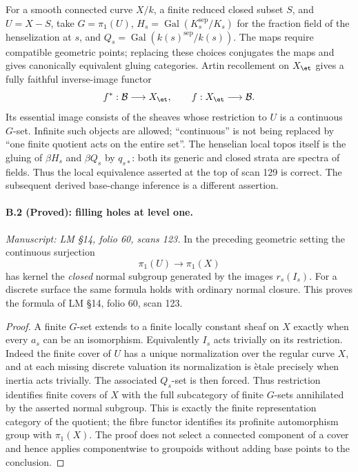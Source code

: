 For a smooth connected curve $X/k$, a finite reduced closed subset
$S$, and $U=X-S$, take $G=\pi_1(U)$,
$H_s=\operatorname{Gal}(K_s^{\mathrm{sep}}/K_s)$ for the fraction field
of the henselization at $s$, and $Q_s=\operatorname{Gal}(k(s)^{\mathrm{sep}}/k(s))$.
The maps require compatible geometric points; replacing these choices
conjugates the maps and gives canonically equivalent gluing categories.
Artin recollement on $X_{\et}$ gives a fully faithful inverse-image
functor
\[
 f^*:\mathcal B\longrightarrow X_{\et},\qquad
 f:X_{\et}\longrightarrow\mathcal B.
\]
Its essential image consists of the sheaves whose restriction to $U$
is a continuous $G$-set. Infinite such objects are allowed; ``continuous''
is not being replaced by ``one finite quotient acts on the entire set''.
The henselian local topos itself is the gluing of $\beta H_s$ and
$\beta Q_s$ by $q_{s*}$: both its generic and closed strata are spectra
of fields. Thus the local equivalence asserted at the top of scan 129
is correct. The subsequent derived base-change inference is a different
assertion.

\paragraph{B.2 (Proved): filling holes at level one.}\label{B2}
\textit{Manuscript: LM \S14, folio 60, scans 123.}
In the preceding geometric setting the continuous surjection
\[
 \pi_1(U)\longrightarrow\pi_1(X)
\]
has kernel the \emph{closed} normal subgroup generated by the images
$r_s(I_s)$. For a discrete surface the same formula holds with ordinary
normal closure. This proves the formula of LM \S14, folio 60, scan 123.

\begin{proof}
A finite $G$-set extends to a finite locally constant sheaf on $X$
exactly when every $a_s$ can be an isomorphism. Equivalently $I_s$
acts trivially on its restriction. Indeed the finite cover of $U$ has
a unique normalization over the regular curve $X$, and at each missing
discrete valuation its normalization is \`etale precisely when inertia
acts trivially. The associated $Q_s$-set is then forced. Thus restriction
identifies finite covers of $X$ with the full subcategory of finite
$G$-sets annihilated by the asserted normal subgroup. This is exactly
the finite representation category of the quotient; the fibre functor
identifies its profinite automorphism group with $\pi_1(X)$. The proof
does not select a connected component of a cover and hence applies
componentwise to groupoids without adding base points to the conclusion.
\end{proof}


